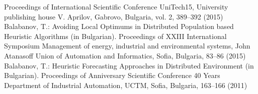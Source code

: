 \documentclass{llncs}
\begin{document}
\begin{thebibliography}{}
Proceedings of International Scientific Conference UniTech15, University publishing house V. Aprilov, Gabrovo, Bulgaria, vol. 2, 389--392 (2015)
%
Balabanov, T.:
Avoiding Local Optimums in Distributed Population based Heuristic Algorithms (in Bulgarian).
Proceedings of XXIII International Symposium Management of energy, industrial and environmental systems, John Atanasoff Union of Automation and Informatics, Sofia, Bulgaria, 83--86 (2015)
%
Balabanov, T.:
Heuristic Forecasting Approaches in Distributed Environment (in Bulgarian).
Proceedings of Anniversary Scientific Conference 40 Years Department of Industrial Automation, UCTM, Sofia, Bulgaria, 163--166 (2011)
%
\end{thebibliography}
\end{document}
